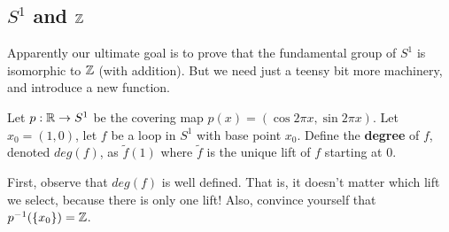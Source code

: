 \subsection{$S^1$ and $\mathbb Z$} Apparently our ultimate goal is to prove that the fundamental group of $S^1$ is isomorphic to $\mathbb Z$ (with addition). But we need just a teensy bit more machinery, and introduce a new function. 
\begin{definition}
	Let $p: \mathbb R\to S^1$ be the covering map $p(x)=(\cos 2\pi x, \sin 2\pi x)$. Let $x_0=(1,0)$, let $f$ be a loop in $S^1$ with base point $x_0$. Define the \textbf{degree} of $f$, denoted $deg(f)$, as $\widetilde{f}(1)$ where $\widetilde{f}$ is the unique lift of $f$ starting at $0$. 
\end{definition}

First, observe that $deg(f)$ is well defined. That is, it doesn't matter which lift we select, because there is only one lift! Also, convince yourself that $p^{-1}(\left\{x_0\right\})=\mathbb Z$.

